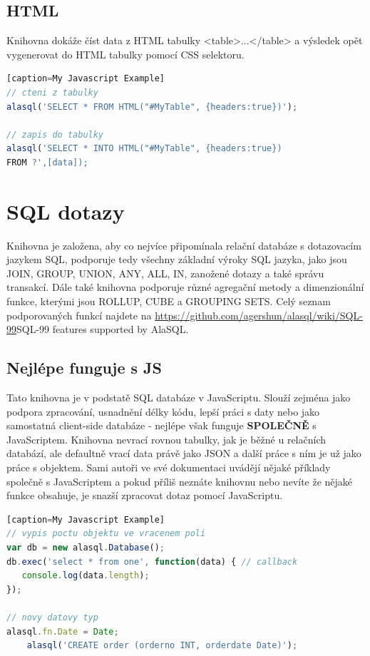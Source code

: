 \documentclass[a4, titlepage]{article}
\begin{document}
\subsection{HTML}
Knihovna dokáže číst data z HTML tabulky <table>...</table> a výsledek opět vygenerovat do HTML tabulky pomocí CSS selektoru.
\begin{lstlisting}[language=JavaScript][caption=My Javascript Example]
// cteni z tabulky
alasql('SELECT * FROM HTML("#MyTable", {headers:true})');

// zapis do tabulky
alasql('SELECT * INTO HTML("#MyTable", {headers:true}) 
FROM ?',[data]);
\end{lstlisting}


\section{SQL dotazy}
Knihovna je založena, aby co nejvíce připomínala relační databáze s dotazovacím jazykem SQL, podporuje tedy všechny základní výroky SQL jazyka, jako jsou JOIN, GROUP, UNION, ANY, ALL, IN, zanožené dotazy a také správu transakcí. Dále také knihovna podporuje různé agregační metody a dimenzionální funkce, kterými jsou ROLLUP, CUBE a GROUPING SETS. Celý seznam podporovaných funkcí najdete na \url{https://github.com/agershun/alasql/wiki/SQL-99}{SQL-99 features supported by AlaSQL}.

\subsection{Nejlépe funguje s JS}
Tato knihovna je v podstatě SQL databáze v JavaScriptu. Slouží zejména jako podpora zpracování, usnadnění délky kódu, lepší práci s daty nebo jako samostatná client-side databáze - nejlépe však funguje \textbf{SPOLEČNĚ} s JavaScriptem. Knihovna nevrací rovnou tabulky, jak je běžné u relačních databází, ale defaultně vrací data právě jako JSON a další práce s ním je už jako práce s objektem. Sami autoři ve své dokumentaci uvádějí nějaké příklady společně s JavaScriptem a pokud příliš neznáte knihovnu nebo nevíte že nějaké funkce obsahuje, je snazší zpracovat dotaz pomocí JavaScriptu.

\begin{lstlisting}[language=JavaScript][caption=My Javascript Example]
// vypis poctu objektu ve vracenem poli
var db = new alasql.Database();
db.exec('select * from one', function(data) { // callback
   console.log(data.length);						
});

// novy datovy typ
alasql.fn.Date = Date;
    alasql('CREATE order (orderno INT, orderdate Date)');
\end{lstlisting}
\end{document}
